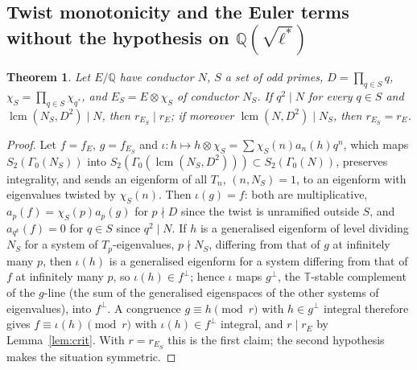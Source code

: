 \documentclass[11pt]{amsart}
\newtheorem{theorem}{Theorem}[section]
\theoremstyle{definition}
\newcommand{\Q}{\mathbb{Q}}
\newcommand{\T}{\mathbb{T}}
\begin{document}
\subsection{Twist monotonicity and the Euler terms without the hypothesis on \texorpdfstring{$\Q(\sqrt{\ell^*})$}{Q(sqrt l*)}}\label{sec:twisting}
\begin{theorem}\label{thm:twist}
Let $E/\Q$ have conductor $N$, $S$ a set of odd primes, $D=\prod_{q\in S}q$, $\chi_S=\prod_{q\in S}\chi_{q^*}$, and $E_S=E\otimes\chi_S$ of conductor $N_S$. If $q^2\mid N$ for every $q\in S$ and $\operatorname{lcm}(N_S,D^2)\mid N$, then $r_{E_S}\mid r_E$; if moreover $\operatorname{lcm}(N,D^2)\mid N_S$, then $r_{E_S}=r_E$.
\end{theorem}
\begin{proof}
Let $f=f_E$, $g=f_{E_S}$ and $\iota\colon h\mapsto h\otimes\chi_S=\sum\chi_S(n)a_n(h)q^n$, which maps $S_2(\Gamma_0(N_S))$ into $S_2(\Gamma_0(\operatorname{lcm}(N_S,D^2)))\subset S_2(\Gamma_0(N))$, preserves integrality, and sends an eigenform of all $T_n$, $(n,N_S)=1$, to an eigenform with eigenvalues twisted by $\chi_S(n)$. Then $\iota(g)=f$: both are multiplicative, $a_p(f)=\chi_S(p)a_p(g)$ for $p\nmid D$ since the twist is unramified outside $S$, and $a_{q^k}(f)=0$ for $q\in S$ since $q^2\mid N$. If $h$ is a generalised eigenform of level dividing $N_S$ for a system of $T_p$-eigenvalues, $p\nmid N_S$, differing from that of $g$ at infinitely many $p$, then $\iota(h)$ is a generalised eigenform for a system differing from that of $f$ at infinitely many $p$, so $\iota(h)\in f^\perp$; hence $\iota$ maps $g^\perp$, the $\T$-stable complement of the $g$-line (the sum of the generalised eigenspaces of the other systems of eigenvalues), into $f^\perp$. A congruence $g\equiv h\pmod r$ with $h\in g^\perp$ integral therefore gives $f\equiv\iota(h)\pmod r$ with $\iota(h)\in f^\perp$ integral, and $r\mid r_E$ by Lemma~\ref{lem:crit}. With $r=r_{E_S}$ this is the first claim; the second hypothesis makes the situation symmetric.
\end{proof}
\end{document}
